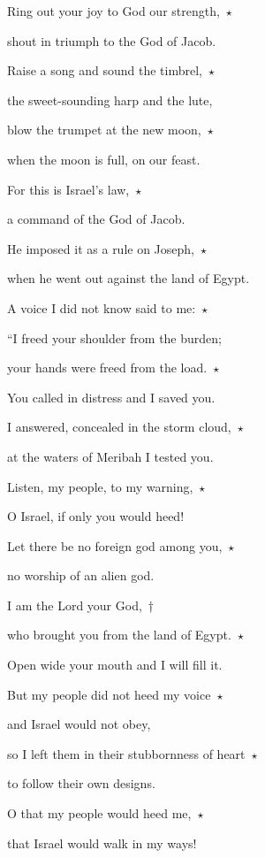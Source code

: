 \noindent Ring out your joy to God our strength,~$\star$~\nopagebreak

shout in triumph to the God of Jacob.

\noindent Raise a song and sound the timbrel,~$\star$~\nopagebreak

the sweet-sounding harp and the lute,

\noindent blow the trumpet at the new moon,~$\star$~\nopagebreak

when the moon is full, on our feast.

\noindent For this is Israel’s law,~$\star$~\nopagebreak

a command of the God of Jacob.

\noindent He imposed it as a rule on Joseph,~$\star$~\nopagebreak

when he went out against the land of Egypt.

\noindent A voice I did not know said to me:~$\star$~\nopagebreak

“I freed your shoulder from the burden;

\noindent your hands were freed from the load.~$\star$~\nopagebreak

You called in distress and I saved you.

\noindent I answered, concealed in the storm cloud,~$\star$~\nopagebreak

at the waters of Meribah I tested you.

\noindent Listen, my people, to my warning,~$\star$~\nopagebreak

O Israel, if only you would heed!

\noindent Let there be no foreign god among you,~$\star$~\nopagebreak

no worship of an alien god.

\noindent I am the Lord your God,~†~\nopagebreak

who brought you from the land of Egypt.~$\star$~\nopagebreak

Open wide your mouth and I will fill it.

\noindent But my people did not heed my voice~$\star$~\nopagebreak

and Israel would not obey,

\noindent so I left them in their stubbornness of heart~$\star$~\nopagebreak

to follow their own designs.

\noindent O that my people would heed me,~$\star$~\nopagebreak

that Israel would walk in my ways!

